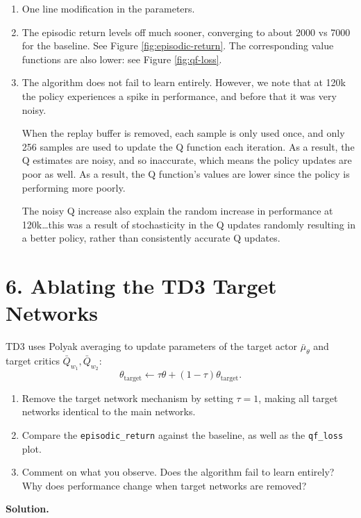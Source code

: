 \documentclass[11pt]{article}
\begin{document}
\begin{enumerate}
    \item[(a)] One line modification in the parameters.
    \item[(b)] The episodic return levels off much sooner, converging to about 2000 vs 7000 for the baseline. See Figure \ref{fig:episodic-return}.
        The corresponding value functions are also lower: see Figure \ref{fig:qf-loss}.
    \item[(c)] The algorithm does not fail to learn entirely.
        However, we note that at 120k the policy experiences a spike in performance, and before that it was very noisy.

        When the replay buffer is removed, each sample is only used once, and only 256 samples are used to update the Q function each iteration.
        As a result, the Q estimates are noisy, and so inaccurate, which means the policy updates are poor as well.
        As a result, the Q function's values are lower since the policy is performing more poorly.

        The noisy Q increase also explain the random increase in performance at 120k\ldots this was a result of stochasticity in the Q updates randomly resulting in a better policy, rather than consistently accurate Q updates.
\end{enumerate}

\section*{6. Ablating the TD3 Target Networks}
TD3 uses Polyak averaging to update parameters of the target actor $\bar{\mu}_\theta$ and target critics $\bar{Q}_{w_1}, \bar{Q}_{w_2}$:
\[
\theta_{\text{target}} \leftarrow \tau \theta + (1-\tau)\theta_{\text{target}}.
\]
\begin{enumerate}
    \item[(a)] Remove the target network mechanism by setting $\tau = 1$, making all target networks identical to the main networks.
    \item[(b)] Compare the \texttt{episodic\_return} against the baseline, as well as the \texttt{qf\_loss} plot.
    \item[(c)] Comment on what you observe. Does the algorithm fail to learn entirely? Why does performance change when target networks are removed?
\end{enumerate}

\textbf{Solution.}
\end{document}
